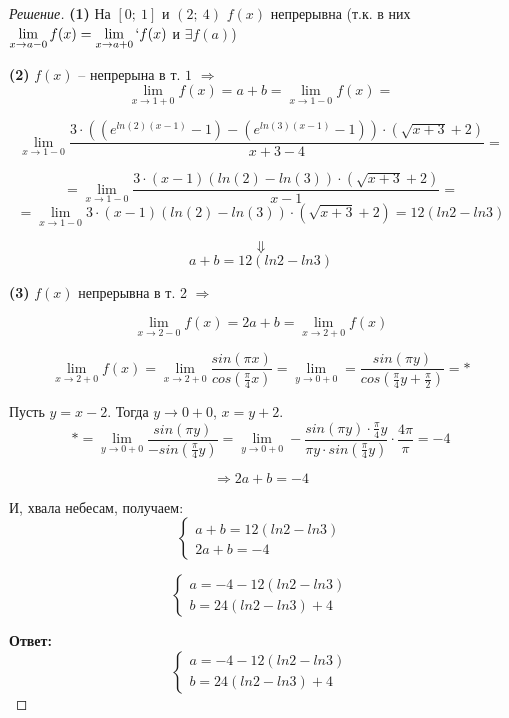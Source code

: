 \documentclass[a4paper,12pt]{article}
\begin{document}
        \begin{proof}[Решение]
            \textbf{(1)} На $[0;\ 1]$ и $(2;\ 4)$ $f(x)$ непрерывна (т.к. в них $\lim\limits_{x\to a-0} f(x)= \lim\limits_{x\to a + 0}` f(x)$ и $\exists f(a)$)

            \textbf{(2)} $f(x)$ -- непрерына в т. $1$ $\Rightarrow$
            $$\lim\limits_{x\to 1+0} f(x) = a + b = \lim\limits_{x\to 1-0} f(x) = $$

            $$ \lim\limits_{x\to 1-0} 
                \frac{3\cdot ((e^{ln(2)(x -1)} - 1) - (e^{ln(3)(x -1)} - 1)) \cdot (\sqrt{x+3} + 2)} 
                     {x + 3 - 4} =
            $$

            $$
                = \lim\limits_{x\to 1-0}\frac{3\cdot (x - 1)(ln(2) - ln(3)) \cdot (\sqrt{x+3} + 2)} 
                     {x - 1} = $$
            $$
            =  \lim\limits_{x\to 1-0} 3\cdot (x - 1)(ln(2) - ln(3)) \cdot (\sqrt{x+3} + 2) = 12 (ln2 - ln3)
            $$

            $$\Downarrow$$
            $$a + b  = 12 (ln2 - ln3)$$

            \textbf{(3)}
            $f(x)$ непрерывна в т. 2 $\Rightarrow$ 

            $$\lim\limits_{x\to 2-0} f(x) = 2a + b = \lim\limits_{x\to 2+0}f(x)$$

            $$\lim\limits_{x\to 2+0} f(x) = 
            \lim\limits_{x\to 2+0} \frac{sin(\pi x)}{cos(\frac{\pi}{4}x)} = \lim\limits_{y\to 0+0} = \frac{sin(\pi y)}{cos(\frac{\pi}{4}y + \frac{\pi}{2})} = *$$

            Пусть $y = x - 2$. Тогда $y \to 0+0$, $x = y + 2$.
            $$ * = \lim\limits_{y\to 0+0} \frac{sin(\pi y)}{-sin(\frac{\pi}{4}y)}  = \lim\limits_{y\to 0+0} -\frac{sin(\pi y) \cdot \frac{\pi}{4}y}
                        {\pi y \cdot sin(\frac{\pi}{4} y)}\cdot \frac{4\pi}{\pi} = -4
            $$

            $$\Rightarrow 2a + b = -4$$

            И, хвала небесам, получаем:
            \begin{equation*}
                 \begin{cases}
                   a + b = 12 (ln2 - ln3) \\
                   2a + b = -4
                 \end{cases}
            \end{equation*}

            \begin{equation*}
                 \begin{cases}
                   a = -4 - 12 (ln2 - ln3) \\
                   b = 24(ln2 - ln3) + 4
                 \end{cases}
            \end{equation*}

            \textbf{Ответ:} \begin{equation*}
                 \begin{cases}
                   a = -4 - 12 (ln2 - ln3) \\
                   b = 24(ln2 - ln3) + 4
                 \end{cases}
            \end{equation*}
        \end{proof}
\end{document}
